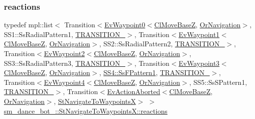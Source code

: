 \subsubsection{\texorpdfstring{reactions}{reactions}}
{\footnotesize\ttfamily typedef mpl\+::list$<$ Transition$<$\hyperlink{structcl__move__base__z_1_1EvWaypoint0}{Ev\+Waypoint0}$<$\hyperlink{classcl__move__base__z_1_1ClMoveBaseZ}{Cl\+Move\+BaseZ}, \hyperlink{classsm__dance__bot__2_1_1OrNavigation}{Or\+Navigation}$>$, S\+S1\+::\+Ss\+Radial\+Pattern1, \hyperlink{structsm__dance__bot__2_1_1StNavigateToWaypointsX_1_1TRANSITION__1}{T\+R\+A\+N\+S\+I\+T\+I\+O\+N\+\_}$>$, Transition$<$\hyperlink{structcl__move__base__z_1_1EvWaypoint1}{Ev\+Waypoint1}$<$\hyperlink{classcl__move__base__z_1_1ClMoveBaseZ}{Cl\+Move\+BaseZ}, \hyperlink{classsm__dance__bot__2_1_1OrNavigation}{Or\+Navigation}$>$, S\+S2\+::\+Ss\+Radial\+Pattern2, \hyperlink{structsm__dance__bot__2_1_1StNavigateToWaypointsX_1_1TRANSITION__2}{T\+R\+A\+N\+S\+I\+T\+I\+O\+N\+\_}$>$, Transition$<$\hyperlink{structcl__move__base__z_1_1EvWaypoint2}{Ev\+Waypoint2}$<$\hyperlink{classcl__move__base__z_1_1ClMoveBaseZ}{Cl\+Move\+BaseZ}, \hyperlink{classsm__dance__bot__2_1_1OrNavigation}{Or\+Navigation}$>$, S\+S3\+::\+Ss\+Radial\+Pattern3, \hyperlink{structsm__dance__bot__2_1_1StNavigateToWaypointsX_1_1TRANSITION__3}{T\+R\+A\+N\+S\+I\+T\+I\+O\+N\+\_}$>$, Transition$<$\hyperlink{structcl__move__base__z_1_1EvWaypoint3}{Ev\+Waypoint3}$<$\hyperlink{classcl__move__base__z_1_1ClMoveBaseZ}{Cl\+Move\+BaseZ}, \hyperlink{classsm__dance__bot__2_1_1OrNavigation}{Or\+Navigation}$>$, \hyperlink{structsm__dance__bot__2_1_1SS4_1_1SsFPattern1}{S\+S4\+::\+Ss\+F\+Pattern1}, \hyperlink{structsm__dance__bot__2_1_1StNavigateToWaypointsX_1_1TRANSITION__4}{T\+R\+A\+N\+S\+I\+T\+I\+O\+N\+\_}$>$, Transition$<$\hyperlink{structcl__move__base__z_1_1EvWaypoint4}{Ev\+Waypoint4}$<$\hyperlink{classcl__move__base__z_1_1ClMoveBaseZ}{Cl\+Move\+BaseZ}, \hyperlink{classsm__dance__bot__2_1_1OrNavigation}{Or\+Navigation}$>$, S\+S5\+::\+Ss\+S\+Pattern1, \hyperlink{structsm__dance__bot__2_1_1StNavigateToWaypointsX_1_1TRANSITION__5}{T\+R\+A\+N\+S\+I\+T\+I\+O\+N\+\_}$>$, Transition$<$\hyperlink{structsmacc_1_1default__events_1_1EvActionAborted}{Ev\+Action\+Aborted}$<$\hyperlink{classcl__move__base__z_1_1ClMoveBaseZ}{Cl\+Move\+BaseZ}, \hyperlink{classsm__dance__bot__2_1_1OrNavigation}{Or\+Navigation}$>$, \hyperlink{structsm__dance__bot__2_1_1StNavigateToWaypointsX}{St\+Navigate\+To\+WaypointsX}$>$ $>$ \hyperlink{structsm__dance__bot__2_1_1StNavigateToWaypointsX_aacde4993376bc15f63703c3d676f2114}{sm\+\_\+dance\+\_\+bot\+\_\+::\+St\+Navigate\+To\+Waypoints\+X\+::reactions}}



